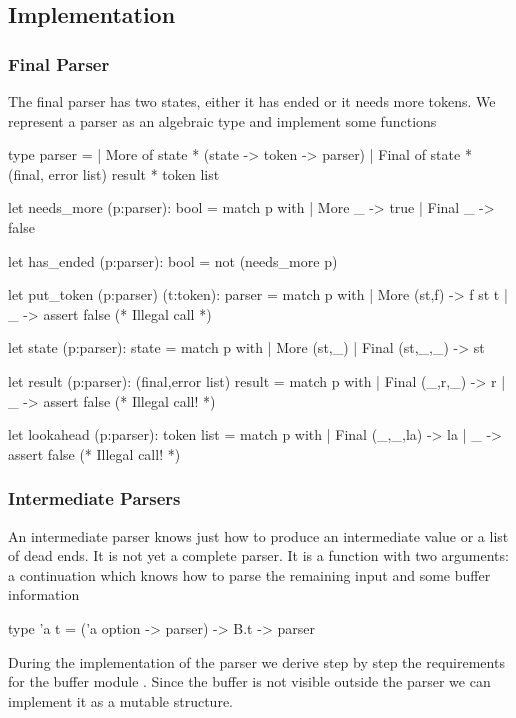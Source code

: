 \subsection{Implementation}

\subsubsection{Final Parser}
The final parser has two states, either it has ended or it needs more
tokens. We represent a parser as an algebraic type and implement some
functions
%
\begin{ocaml}
  type parser =
  | More  of state * (state -> token -> parser)
  | Final of state * (final, error list) result * token list

  let needs_more (p:parser): bool =
    match p with
    | More _ -> true | Final _ -> false

  let has_ended (p:parser): bool = not (needs_more p)

  let put_token (p:parser) (t:token): parser =
    match p with
    | More (st,f) ->
        f st t
    | _ ->
      assert false (* Illegal call *)

  let state (p:parser): state =
    match p with
    | More (st,_) | Final (st,_,_) -> st

  let result (p:parser): (final,error list) result =
    match p with
    | Final (_,r,_) -> r
    | _ -> assert false (* Illegal call! *)

  let lookahead (p:parser): token list =
    match p with
    | Final (_,_,la) -> la
    | _ -> assert false (* Illegal call! *)
\end{ocaml}
%


\subsubsection{Intermediate Parsers}
An intermediate parser knows just how to produce an intermediate value or a
list of dead ends. It is not yet a complete parser. It is a function with two
arguments: a continuation which knows how to parse the remaining input and
some buffer information
%
\begin{ocaml}
  type 'a t = ('a option -> parser) -> B.t -> parser
\end{ocaml}
%

During the implementation of the parser we derive step by step the
requirements for the buffer module . Since the buffer is not visible
outside the parser we can implement it as a mutable structure.

